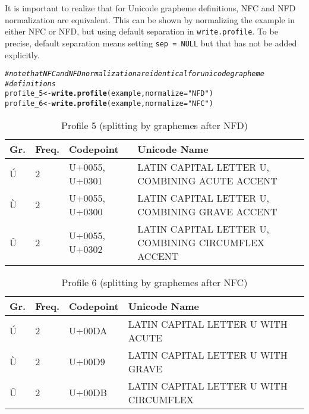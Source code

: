 \documentclass[output=inprep,
		biblatex
		]{LSP/langsci}\usepackage[]{graphicx}\usepackage[]{color}
\makeatletter
\newcommand{\hlstr}[1]{\textcolor[rgb]{0.192,0.494,0.8}{#1}}%
\newcommand{\hlcom}[1]{\textcolor[rgb]{0.678,0.584,0.686}{\textit{#1}}}%
\newcommand{\hlstd}[1]{\textcolor[rgb]{0.345,0.345,0.345}{#1}}%
\newcommand{\hlkwb}[1]{\textcolor[rgb]{0.69,0.353,0.396}{#1}}%
\newcommand{\hlkwc}[1]{\textcolor[rgb]{0.333,0.667,0.333}{#1}}%
\newcommand{\hlkwd}[1]{\textcolor[rgb]{0.737,0.353,0.396}{\textbf{#1}}}%
\newenvironment{kframe}{%
 \def\at@end@of@kframe{}%
 \ifinner\ifhmode%
  \def\at@end@of@kframe{\end{minipage}}%
  \begin{minipage}{\columnwidth}%
 \fi\fi%
 \def\FrameCommand##1{\hskip\@totalleftmargin \hskip-\fboxsep
 \colorbox{shadecolor}{##1}\hskip-\fboxsep
     \hskip-\linewidth \hskip-\@totalleftmargin \hskip\columnwidth}%
 \MakeFramed {\advance\hsize-\width
   \@totalleftmargin\z@ \linewidth\hsize
   \@setminipage}}%
 {\par\unskip\endMakeFramed%
 \at@end@of@kframe}
\newenvironment{knitrout}{}{} %
\makeatother
\begin{document}
\noindent It is important to realize that for Unicode grapheme definitions, NFC 
and NFD normalization are equivalent. This can be shown by normalizing the 
example in either NFC or NFD, but using default separation in 
\texttt{write.profile}. To be precise, default separation means setting \texttt{sep = NULL} 
but that has not be added explicitly.

\begin{knitrout}\footnotesize
{}\color{fgcolor}\begin{kframe}
\begin{alltt}
\hlcom{# note that NFC and NFD normalization are identical for unicode grapheme}
\hlcom{# definitions}
\hlstd{profile_5} \hlkwb{<-} \hlkwd{write.profile}\hlstd{(example,} \hlkwc{normalize} \hlstd{=} \hlstr{"NFD"}\hlstd{)}
\hlstd{profile_6} \hlkwb{<-} \hlkwd{write.profile}\hlstd{(example,} \hlkwc{normalize} \hlstd{=} \hlstr{"NFC"}\hlstd{)}
\end{alltt}
\end{kframe}
\end{knitrout}

\begin{table}[H]
\centering
\begingroup\scriptsize
\begin{tabular}{llll}
  \toprule
Gr. & Freq. & Codepoint & Unicode Name \\ 
  \midrule
Ú & 2 & U+0055, U+0301 & LATIN CAPITAL LETTER U, COMBINING ACUTE ACCENT \\ 
  Ù & 2 & U+0055, U+0300 & LATIN CAPITAL LETTER U, COMBINING GRAVE ACCENT \\ 
  Û & 2 & U+0055, U+0302 & LATIN CAPITAL LETTER U, COMBINING CIRCUMFLEX ACCENT \\ 
   \bottomrule
\end{tabular}
\endgroup
\caption{Profile 5 (splitting by graphemes after NFD)} 
\label{tab:profile5}
\end{table}


\begin{table}[H]
\centering
\begingroup\scriptsize
\begin{tabular}{llll}
  \toprule
Gr. & Freq. & Codepoint & Unicode Name \\ 
  \midrule
Ú & 2 & U+00DA & LATIN CAPITAL LETTER U WITH ACUTE \\ 
  Ù & 2 & U+00D9 & LATIN CAPITAL LETTER U WITH GRAVE \\ 
  Û & 2 & U+00DB & LATIN CAPITAL LETTER U WITH CIRCUMFLEX \\ 
   \bottomrule
\end{tabular}
\endgroup
\caption{Profile 6 (splitting by graphemes after NFC)} 
\label{tab:profile6}
\end{table}
\end{document}
